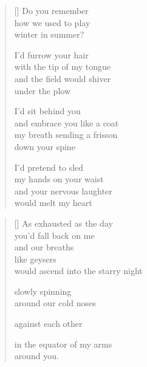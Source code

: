 \documentclass[14pt]{extbook}
\newcommand*{\centeredornament}{\centerline{\pgfornament[width=6cm]{88}}}
\begin{document}

\newpage

\vspace*{-15mm}
\centeredornament
\vspace*{-7mm}


\settowidth{\versewidth}{and embrace you like a coat}

\begin{verse}[\versewidth]
  Do you remember \\
  how we used to play \\
  winter in summer?

  I'd furrow your hair \\
  with the tip of my tongue \\
  and the field would shiver \\
  under the plow

  I'd sit behind you \\
  and embrace you like a coat \\
  my breath sending a frisson \\
  down your spine

  I'd pretend to sled \\
  my hands on your waist \\
  and your nervous laughter \\
  would melt my heart
\end{verse}

\newpage

\settowidth{\versewidth}{would ascend into the starry night}

\begin{verse}[\versewidth]
  As exhausted as the day \\
  you'd fall back on me \\
  and our breaths \\
  like geysers \\
  would ascend into the starry night

  slowly spinning \\
  around our cold noses

  against each other

  in the equator of my arms \\
  around you.
\end{verse}

\end{document}

